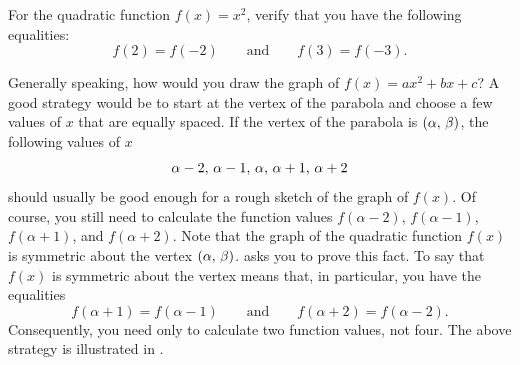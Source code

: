 \documentclass[a4paper,oneside,12pt]{article}
\begin{document}
\begin{exercise}
For the quadratic function $f(x) = x^2$, verify that you have the
following equalities:
\[
f(2) = f(-2)
\qquad
\text{and}
\qquad
f(3) = f(-3).
\]
\end{exercise}

Generally speaking, how would you draw the graph of
$f(x) = ax^2 + bx + c$?  A good strategy would be to start at the
vertex of the parabola and choose a few values of $x$ that are equally
spaced.  If the vertex of the parabola is $\left\lparen{\alpha},\, {\beta}\right\rparen$, the
following values of $x$
\[
{\alpha-2},\, {\alpha-1},\, {\alpha},\, {\alpha+1},\, {\alpha+2}
\]
should usually be good enough for a rough sketch of the graph of
$f(x)$.  Of course, you still need to calculate the function values
$f(\alpha-2)$, $f(\alpha-1)$, $f(\alpha+1)$, and $f(\alpha+2)$.  Note
that the graph of the quadratic function $f(x)$ is symmetric about the
vertex $\left\lparen{\alpha},\, {\beta}\right\rparen$.
 asks you to prove this
fact.  To say that $f(x)$ is symmetric about the vertex means that, in
particular, you have the equalities
\[
f(\alpha+1) = f(\alpha-1)
\qquad
\text{and}
\qquad
f(\alpha+2) = f(\alpha-2).
\]
Consequently, you need only to calculate two function values, not
four.  The above strategy is illustrated in
.
\end{document}
